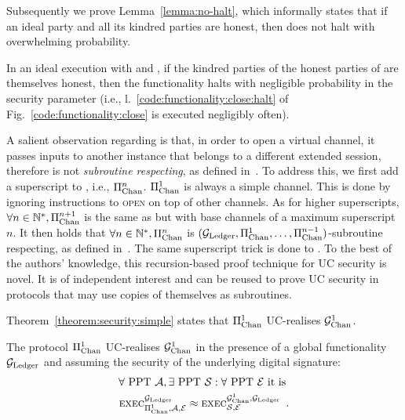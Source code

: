   Subsequently we prove Lemma~\ref{lemma:no-halt}, which informally states that
  if an ideal party and all its kindred parties are honest, then \fchan does not
  halt with overwhelming probability.

\begin{lemma}[No halt]
\label{lemma:no-halt}
  In an ideal execution with \fchan and \simulator, if the kindred parties of
  the honest parties of \fchan are themselves honest, then the functionality
  halts with negligible probability in the security parameter (i.e.,
  l.~\ref{code:functionality:close:halt} of Fig.~\ref{code:functionality:close}
  is executed negligibly often).
\end{lemma}


  A salient observation regarding \pchan is that, in order to
  open a virtual channel, it passes inputs to another \pchan instance that
  belongs to a different extended session, therefore \pchan is not
  \emph{subroutine respecting}, as defined in~\cite{uc}. To
  address this, we first add a superscript to \pchan, i.e.,
  $\Pi_{\mathrm{Chan}}^{n}$. $\Pi_{\mathrm{Chan}}^{1}$ is always a simple channel.
  This is done by ignoring instructions to \textsc{open} on top of other
  channels. As for higher superscripts, $\forall n \in
  \mathbb{N}^*, \Pi_{\mathrm{Chan}}^{n+1}$ is the same as \pchan but with
  base channels of a maximum superscript $n$. It then holds that $\forall
  n \in \mathbb{N}^*, \Pi_{\mathrm{Chan}}^{n}$ is $(\mathcal{G}_{\mathrm{Ledger}}, \Pi_{\mathrm{Chan}}^{1}, \dots,
  \Pi_{\mathrm{Chan}}^{n-1})$-subroutine respecting, as defined
  in~\cite{DBLP:conf/tcc/BadertscherCHTZ20}. The same superscript trick is done
  to \fchan. To
  the best of the authors' knowledge, this recursion-based proof technique for
  UC security is novel. It is of independent interest and can be reused to prove
  UC security in protocols that may use copies of themselves as subroutines.

  Theorem~\ref{theorem:security:simple} states
  that $\Pi_{\mathrm{Chan}}^{1}$ UC-realises $\mathcal{G}_{\mathrm{Chan}}^{1}$.

\begin{theorem}
  \label{theorem:security:simple}
  The protocol $\Pi_{\mathrm{Chan}}^{1}$ UC-realises $\mathcal{G}_{\mathrm{Chan}}^{1}$ in the presence of a
  global functionality $\mathcal{G}_{\mathrm{Ledger}}$ and assuming the security of the underlying
  digital signature:
  \begin{gather*}
    \forall \text{ PPT } \mathcal{A}, \exists \text{ PPT } \mathcal{S}: \forall
    \text{ PPT } \mathcal{E} \text{ it is }\\
    \textsc{exec}^{\mathcal{G}_{\mathrm{Ledger}}}_{\Pi_{\mathrm{Chan}}^{1}, \mathcal{A}, \mathcal{E}} \approx
    \textsc{exec}^{\mathcal{G}_{\mathrm{Chan}}^{1}, \mathcal{G}_{\mathrm{Ledger}}}_{\mathcal{S}, \mathcal{E}} \enspace.
  \end{gather*}
\end{theorem}


